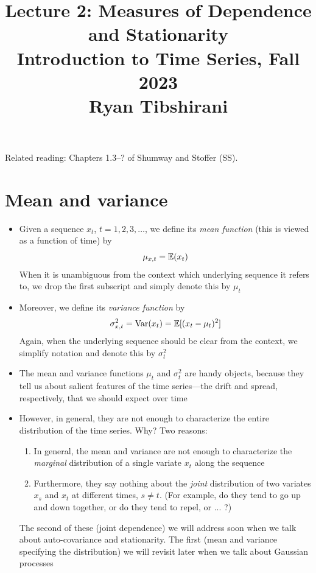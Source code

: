 \documentclass{article}
\title{Lecture 2: Measures of Dependence and Stationarity \\ \smallskip  
\large Introduction to Time Series, Fall 2023 \\ \smallskip
Ryan Tibshirani}
\date{}
\begin{document}
\maketitle
\RaggedRight
\vspace{-50pt}

Related reading: Chapters 1.3--? of Shumway and Stoffer (SS).

\section{Mean and variance}

\begin{itemize}
\item Given a sequence $x_t$, $t = 1,2,3,\dots$, we define its \emph{mean 
    function} (this is viewed as a function of time) by 
  \[
  \mu_{x,t} = \mathbb{E}(x_t)
  \]
  When it is unambiguous from the context which underlying sequence it refers
  to, we drop the first subscript and simply denote this by $\mu_t$

\item Moreover, we define its \emph{variance function} by
  \[
  \sigma^2_{x,t} = \operatorname{Var}(x_t) = \mathbb{E}[(x_t - \mu_t)^2]
  \]
  Again, when the underlying sequence should be clear from the context, we
  simplify notation and denote this by $\sigma^2_t$

\item The mean and variance functions $\mu_t$ and $\sigma^2_t$ are handy 
  objects, because they tell us about salient features of the time series---the
  drift and spread, respectively, that we should expect over time

\item However, in general, they are not enough to characterize the entire
  distribution of the time series. Why? Two reasons: 

  \begin{enumerate}
  \item In general, the mean and variance are not enough to characterize the
    \emph{marginal} distribution of a single variate $x_t$ along the sequence 

  \item Furthermore, they say nothing about the \emph{joint} distribution of
    two variates $x_s$ and $x_t$ at different times, $s \not= t$. (For example,
    do they tend to go up and down together, or do they tend to repel, or ... ?) 
  \end{enumerate}

  The second of these (joint dependence) we will address soon when we talk about
  auto-covariance and stationarity. The first (mean and variance specifying the 
  distribution) we will revisit later when we talk about Gaussian processes  


\end{itemize}
\end{document}

